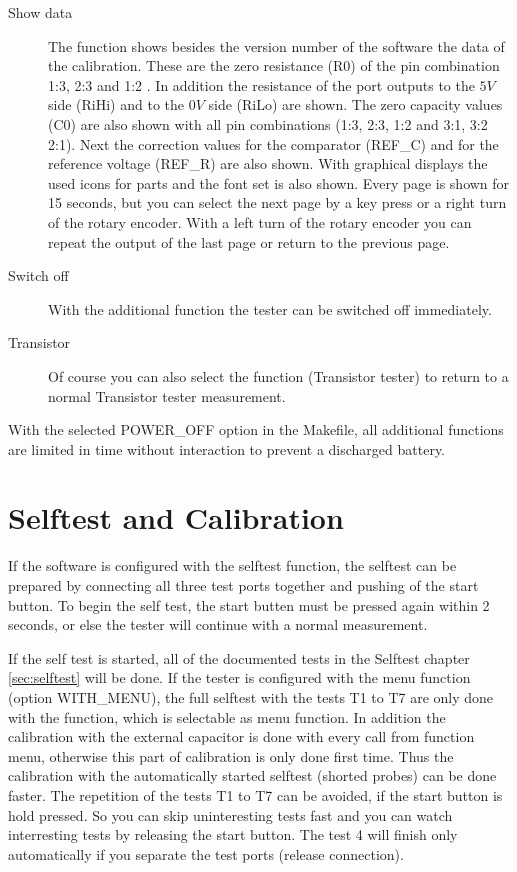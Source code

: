\begin{description}
 \item[Show data]
 The function  shows besides the version number of the software the data of the calibration.
These are the zero resistance (R0) of the pin combination 1:3, 2:3 and 1:2 .
In addition the resistance of the port outputs to the \(5V\) side (RiHi) and
to the \(0V\) side (RiLo) are shown.
The zero capacity values (C0) are also shown with all pin combinations (1:3, 2:3, 1:2 and 3:1, 3:2 2:1).
Next the correction values for the comparator (REF\_C) and for the reference voltage (REF\_R) are also shown.
With graphical displays the used icons for parts and the font set is also shown.
Every page is shown for 15 seconds, but you can select the next page by a key press or a right turn of the rotary encoder.
With a left turn of the rotary encoder you can repeat the output of the last page or return to the previous page.


\item[Switch off]
With the additional function  the tester can be switched off immediately.\\

\item[Transistor]
Of course you can also select the function  (Transistor tester) to return to a normal Transistor tester measurement. 
\end{description}

With the selected POWER\_OFF option in the Makefile, all additional functions are limited in time without interaction to prevent a discharged battery.


\section{Selftest and Calibration}

If the software is configured with the selftest function, the selftest can be prepared by connecting all three
test ports together and pushing of the start button.
To begin the self test, the start butten must be pressed again within 2 seconds, or else the tester will continue
with a normal measurement.

If the self test is started, all of the documented tests in the Selftest chapter \ref{sec:selftest} will be done.
If the tester is configured with the menu function (option WITH\_MENU), 
the full selftest with the tests T1 to T7 are only done with the  function, 
which is selectable as menu function.
In addition the calibration with the external capacitor is done with every call from function menu,
otherwise this part of calibration is only done first time.
Thus the calibration with the automatically started selftest (shorted probes) can be done faster.
The repetition of the tests T1 to T7 can be avoided, if the start button is hold pressed.
So you can skip uninteresting tests fast and you can watch interresting tests by releasing the start button.
The test 4 will finish only automatically if you separate the test ports (release connection).

